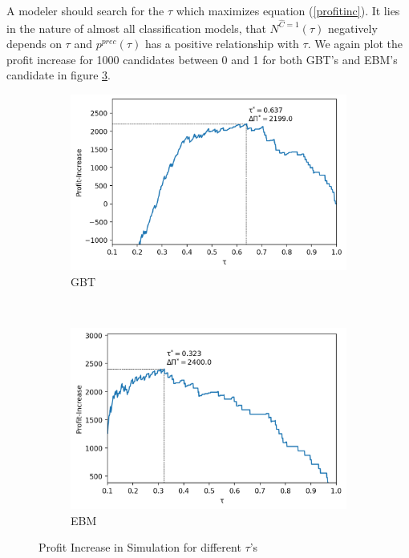 \documentclass[12pt,titlepage]{article}
\begin{document}
\noindent
A modeler should search for the $\tau$ which maximizes equation (\ref{profitinc}). It lies in the nature of almost all classification models, that $N^{\hat{C}=1}(\tau)$ negatively depends on $\tau$ and $p^{prec}(\tau)$ has a positive relationship with $\tau$. We again plot the profit increase for 1000 candidates between 0 and 1 for both GBT's and EBM's candidate in figure \ref{fig:prof_increase_plot}.
\begin{figure}[H]
    \centering
    \begin{subfigure}{.7\textwidth}
      \includegraphics[width=1\linewidth]{gbt_prof_increase_plot.png}
      \caption{GBT}
      \label{fig:gbt_prof_increase_plot}
    \end{subfigure} \\
    \begin{subfigure}{.7\textwidth}
      \includegraphics[width=1\linewidth]{ebm_prof_increase_plot.png}
      \caption{EBM}
      \label{fig:ebm_prof_increase_plot}
    \end{subfigure}
    \caption{Profit Increase in Simulation for different $\tau$'s}
\label{fig:prof_increase_plot}
\end{figure}
\end{document}
